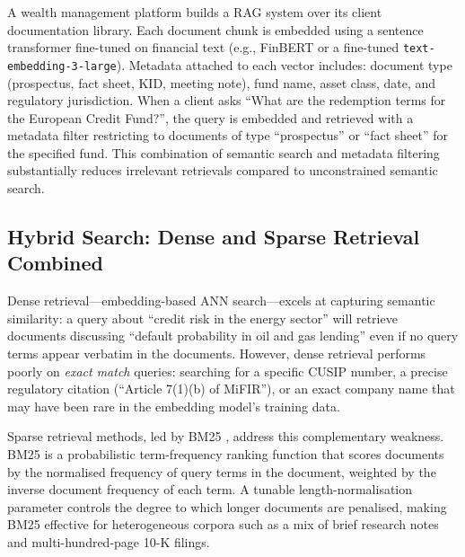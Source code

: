 \begin{deepdive}
\begin{example}
\label{ex:embedding-finance}
A wealth management platform builds a RAG system over its client documentation library.
Each document chunk is embedded using a sentence transformer fine-tuned on financial
text (e.g., FinBERT or a fine-tuned \texttt{text-embedding-3-large}). Metadata
attached to each vector includes: document type (prospectus, fact sheet, KID, meeting
note), fund name, asset class, date, and regulatory jurisdiction. When a client asks
``What are the redemption terms for the European Credit Fund?'', the query is embedded
and retrieved with a metadata filter restricting to documents of type ``prospectus'' or
``fact sheet'' for the specified fund. This combination of semantic search and metadata
filtering substantially reduces irrelevant retrievals compared to unconstrained
semantic search.
\end{example}


\subsection{Hybrid Search: Dense and Sparse Retrieval Combined}
\label{subsec:hybrid-search}

Dense retrieval---embedding-based ANN search---excels at capturing semantic similarity:
a query about ``credit risk in the energy sector'' will retrieve documents discussing
``default probability in oil and gas lending'' even if no query terms appear verbatim
in the documents. However, dense retrieval performs poorly on \emph{exact match}
queries: searching for a specific CUSIP number, a precise regulatory citation (``Article
7(1)(b) of MiFIR''), or an exact company name that may have been rare in the embedding
model's training data.

Sparse retrieval methods, led by BM25 \cite{robertson2009probabilistic}, address this
complementary weakness. BM25 is a probabilistic term-frequency ranking function that
scores documents by the normalised frequency of query terms in the document, weighted
by the inverse document frequency of each term. A tunable length-normalisation parameter
controls the degree to which longer documents are penalised, making BM25 effective for
heterogeneous corpora such as a mix of brief research notes and multi-hundred-page 10-K
filings.


\end{deepdive}

